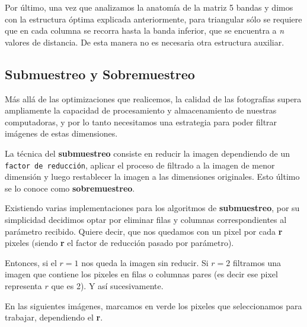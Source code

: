 \documentclass[a4paper]{article}
\begin{document}
Por último, una vez que analizamos la anatomía de la matriz 5 bandas y dimos con la estructura óptima explicada anteriormente, para triangular sólo se requiere que en cada columna se recorra hasta la banda inferior, que se encuentra a \textit{n} valores de distancia. De esta manera no es necesaria otra estructura auxiliar.  

\subsection{Submuestreo y Sobremuestreo}

Más allá de las optimizaciones que realicemos, la calidad de las fotografías supera ampliamente la capacidad de procesamiento y almacenamiento de nuestras computadoras, y por lo tanto necesitamos una estrategia para poder filtrar imágenes de estas dimensiones.

La técnica del \textbf{submuestreo} consiste en reducir la imagen dependiendo de un \texttt{factor de reducción}, aplicar el proceso de filtrado a la imagen de menor dimensión y luego restablecer la imagen a las dimensiones originales. Esto último se lo conoce como \textbf{sobremuestreo}.


Existiendo varias implementaciones para los algoritmos de \textbf{submuestreo}, por su simplicidad decidimos optar por eliminar filas y columnas correspondientes al parámetro recibido. Quiere decir, que nos quedamos con un pixel por cada \textbf{r} pixeles (siendo \textbf{r} el factor de reducción pasado por parámetro).

Entonces, si el $r=1$ nos queda la imagen sin reducir. Si $r=2$ filtramos una imagen que contiene los pixeles en filas o columnas pares (es decir ese pixel representa $r$ que es 2). Y así sucesivamente.

En las siguientes imágenes, marcamos en verde los pixeles que seleccionamos para trabajar, dependiendo el \textbf{r}.
\end{document}
